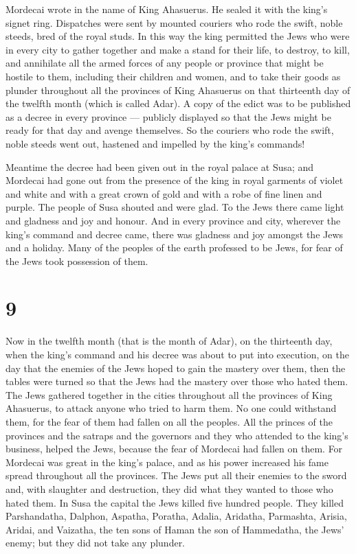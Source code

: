  Mordecai wrote in the name of King Ahasuerus. He sealed it
with the king's signet ring. Dispatches were sent by mounted couriers
who rode the swift, noble steeds, bred of the royal studs. 
In this way the king permitted the Jews who were in every city to gather
together and make a stand for their life, to destroy, to kill, and
annihilate all the armed forces of any people or province that might be
hostile to them, including their children and women, and to take their
goods as plunder  throughout all the provinces of King
Ahasuerus on that thirteenth day of the twelfth month (which is called
Adar).  A copy of the edict was to be published as a decree
in every province --- publicly displayed so that the Jews might be ready
for that day and avenge themselves.  So the couriers who
rode the swift, noble steeds went out, hastened and impelled by the
king's commands!

Meantime the decree had been given out in the royal palace at Susa;
 and Mordecai had gone out from the presence of the king in
royal garments of violet and white and with a great crown of gold and
with a robe of fine linen and purple. The people of Susa shouted and
were glad.  To the Jews there came light and gladness and
joy and honour.  And in every province and city, wherever
the king's command and decree came, there was gladness and joy amongst
the Jews and a holiday. Many of the peoples of the earth professed to be
Jews, for fear of the Jews took possession of them.

\hypertarget{section-8}{%
\section{9}\label{section-8}}

 Now in the twelfth month (that is the month of Adar), on
the thirteenth day, when the king's command and his decree was about to
put into execution, on the day that the enemies of the Jews hoped to
gain the mastery over them, then the tables were turned so that the Jews
had the mastery over those who hated them.  The Jews
gathered together in the cities throughout all the provinces of King
Ahasuerus, to attack anyone who tried to harm them. No one could
withstand them, for the fear of them had fallen on all the peoples.
 All the princes of the provinces and the satraps and the
governors and they who attended to the king's business, helped the Jews,
because the fear of Mordecai had fallen on them.  For
Mordecai was great in the king's palace, and as his power increased his
fame spread throughout all the provinces.  The Jews put all
their enemies to the sword and, with slaughter and destruction, they did
what they wanted to those who hated them.  In Susa the
capital the Jews killed five hundred people.  They killed
Parshandatha, Dalphon, Aspatha,  Poratha, Adalia, Aridatha,
 Parmashta, Arisia, Aridai, and Vaizatha,  the
ten sons of Haman the son of Hammedatha, the Jews' enemy; but they did
not take any plunder.


